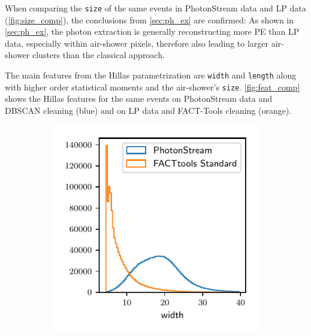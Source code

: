 %
When comparing the \texttt{size} of the same events in PhotonStream data and LP data (\autoref{fig:size_comp}),
the conclusions from \autoref{sec:ph_ex} are confirmed: As shown in
\autoref{sec:ph_ex}, the photon extraction is generally reconstructing more PE
than LP data, especially within air-shower pixels, therefore also leading to
larger air-shower clusters than the classical approach.

The main features from the Hillas parametrization are \texttt{width} and
\texttt{length} along with higher order statistical moments and the
air-shower's \texttt{size}. \autoref{fig:feat_comp} shows the Hillas features for the same events on PhotonStream data and DBSCAN cleaning (blue) and on LP data and FACT-Tools cleaning (orange).
%
\begin{figure}
  \begin{subfigure}{0.5\textwidth}
    \centering
    \includegraphics[width=\textwidth, page=1]{Plots/std_phs_comparison_hist_same_DBSCAN_crab.pdf}
  \end{subfigure}
  \begin{subfigure}{0.5\textwidth}
    \centering

\end{subfigure}
\end{figure}
